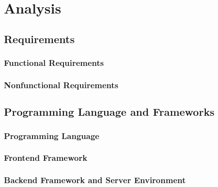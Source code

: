 \chapter{Analysis}
\label{chap:analysis}


\section{Requirements}
\label{sec:requirements}
\subsection{Functional Requirements}
\label{subsec:functional-requirements}

\subsection{Nonfunctional Requirements}
\label{subsec:nonfunctional-requirements}

\section{Programming Language and Frameworks}
\label{sec:programming-language-frameworks}
\subsection{Programming Language}
\label{subsec:programming-language}
\subsection{Frontend Framework}
\label{subsec:frontend-framework}
\subsection{Backend Framework and Server Environment}
\label{subsec:backend-framework-server-env}
